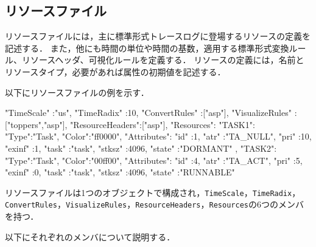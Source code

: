 \subsection{リソースファイル}
\label{subsec:resFile}

リソースファイルには，主に標準形式トレースログに登場するリソースの定義を記述する．
また，他にも時間の単位や時間の基数，適用する標準形式変換ルール、リソースヘッダ、可視化ルールを定義する．
リソースの定義には，名前とリソースタイプ，必要があれば属性の初期値を記述する．

以下にリソースファイルの例を示す．

\begin{File}
{
  "TimeScale" :"us",
  "TimeRadix" :10,
  "ConvertRules"   :["asp"],
  "VisualizeRules" :["toppers","asp"],
  "ResourceHeaders":["asp"],
  "Resources":{
    "TASK1":{
      "Type":"Task",
      "Color":"ff0000",
      "Attributes":{
        "id"    :1,
        "atr"   :"TA_NULL",
        "pri"   :10,
        "exinf" :1,
        "task"  :"task",
        "stksz" :4096,
        "state" :"DORMANT"
      }
    },
    "TASK2":{
      "Type":"Task",
      "Color":"00ff00",
      "Attributes":{
        "id"    :4,
        "atr"   :"TA_ACT",
        "pri"   :5,
        "exinf" :0,
        "task"  :"task",
        "stksz" :4096,
        "state" :"RUNNABLE"
      }
    }
  }
}
\end{File}

リソースファイルは1つのオブジェクトで構成され，\verb|TimeScale|，\verb|TimeRadix|，\verb|ConvertRules|，\verb|VisualizeRules|，\verb|ResourceHeaders|，\verb|Resources|の6つのメンバを持つ．

以下にそれぞれのメンバについて説明する．

